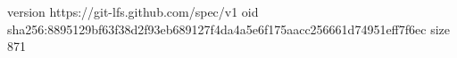 version https://git-lfs.github.com/spec/v1
oid sha256:8895129bf63f38d2f93eb689127f4da4a5e6f175aacc256661d74951eff7f6ec
size 871
